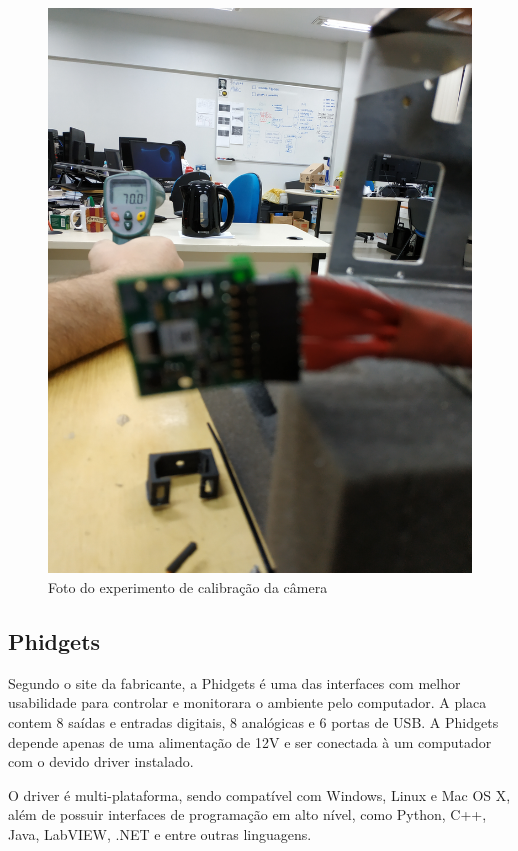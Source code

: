 		
		\begin{figure}[!ht]
		   \centering
		   \includegraphics[width=12cm]{Figures/testecamera.jpg}
		   \caption{Foto do experimento de calibração da câmera}
		   \label{fig:cameratest}
		\end{figure}
		

\subsection{Phidgets}


	Segundo o site da fabricante, a Phidgets é uma das interfaces com melhor usabilidade para controlar e monitorara o ambiente pelo computador. A placa contem 8 saídas e entradas digitais, 8 analógicas e 6 portas de USB. A Phidgets depende apenas de uma alimentação de 12V e ser conectada à um computador com o devido driver instalado. 
	
	O driver é multi-plataforma, sendo compatível com Windows, Linux e Mac OS X, além de possuir interfaces de programação em alto nível, como Python, C++, Java, LabVIEW, .NET e entre outras linguagens.

